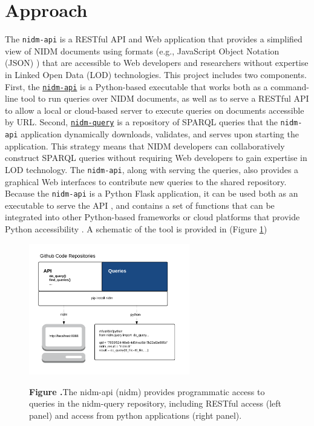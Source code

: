 \documentclass[twocolumn]{bmcart}%
\begin{document}
\section{Approach}\label{approach}
The \texttt{nidm-api} \cite{noauthor_undated-hq} is a RESTful API and Web application that provides a simplified view of NIDM documents using formats (e.g., JavaScript Object Notation (JSON) \cite{Wikipedia_contributors2015-on,noauthor_undated-tz}) that are accessible to Web developers and researchers without expertise in Linked Open Data (LOD) technologies. This project includes two components. First, the \href{https://github.com/incf-nidash/nidm-api}{\texttt{nidm-api}} is a Python-based executable that works both as a command-line tool to run queries over NIDM documents, as well as to serve a RESTful API to allow a local or cloud-based server to execute queries on documents accessible by URL. Second, \href{https://github.com/incf-nidash/nidm-query}{\texttt{nidm-query}} is a repository of SPARQL queries that the \texttt{nidm-api} application dynamically downloads, validates, and serves upon starting the application. This strategy means that NIDM developers can collaboratively construct SPARQL queries without requiring Web developers to gain expertise in LOD technology. The \texttt{nidm-api}, along with serving the queries, also provides a graphical Web interfaces to contribute new queries to the shared repository. Because the \texttt{nidm-api} is a Python Flask \cite{noauthor_undated-ia} application, it can be used both as an executable to serve the API \cite{noauthor_undated-ii}, and contains a set of functions that can be integrated into other Python-based frameworks \cite{noauthor_undated-ej} or cloud platforms that provide Python accessibility \cite{noauthor_undated-jw,Google_undated-aj}. A schematic of the tool is provided in (Figure \ref{fig:01})  \newline \newline

\begin{figure}[h!]
\begin{center}
\includegraphics[width=7cm]{img/figure1}
\end{center}
 \textbf{\label{fig:01}Figure .}{The nidm-api (nidm) provides programmatic access to queries in the nidm-query repository, including RESTful access (left panel) and access from python applications (right panel).}
\end{figure}
\end{document}

